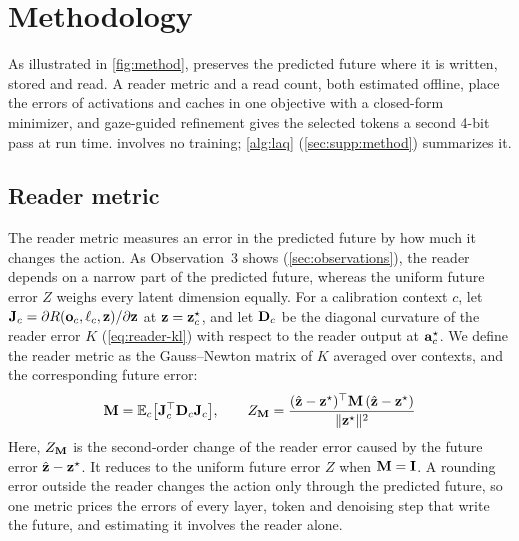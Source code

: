 \section{Methodology}
\label{sec:method}

As illustrated in \cref{fig:method}, \method preserves the predicted future where it is written, stored and read.
A reader metric and a read count, both estimated offline, place the errors of activations and caches in one objective with a closed-form minimizer, and gaze-guided refinement gives the selected tokens a second 4-bit pass at run time.
\method involves no training; \cref{alg:laq} (\cref{sec:supp:method}) summarizes it.

\subsection{Reader metric}
\label{sec:method:metric}

The reader metric measures an error in the predicted future by how much it changes the action.
As Observation~3 shows (\cref{sec:observations}), the reader depends on a narrow part of the predicted future, whereas the uniform future error $Z$ weighs every latent dimension equally.
For a calibration context $c$, let $\mathbf{J}_c = \partial R(\mathbf{o}_c, \ell_c, \mathbf{z})/\partial \mathbf{z}$ at $\mathbf{z} = \mathbf{z}^\star_c$, and let $\mathbf{D}_c$ be the diagonal curvature of the reader error $K$ (\cref{eq:reader-kl}) with respect to the reader output at $\mathbf{a}^\star_c$.
We define the reader metric as the Gauss--Newton matrix of $K$ averaged over contexts, and the corresponding future error:
\begin{equation}
  \mathbf{M} = \mathbb{E}_c\big[\mathbf{J}_c^\top \mathbf{D}_c \mathbf{J}_c\big],
  \qquad
  Z_{\mathbf{M}} = \frac{(\hat{\mathbf{z}} - \mathbf{z}^\star)^\top \mathbf{M}\, (\hat{\mathbf{z}} - \mathbf{z}^\star)}{\|\mathbf{z}^\star\|^2}
  \label{eq:metric}
\end{equation}
Here, $Z_{\mathbf{M}}$ is the second-order change of the reader error caused by the future error $\hat{\mathbf{z}} - \mathbf{z}^\star$.
It reduces to the uniform future error $Z$ when $\mathbf{M} = \mathbf{I}$.
A rounding error outside the reader changes the action only through the predicted future, so one metric prices the errors of every layer, token and denoising step that write the future, and estimating it involves the reader alone.

